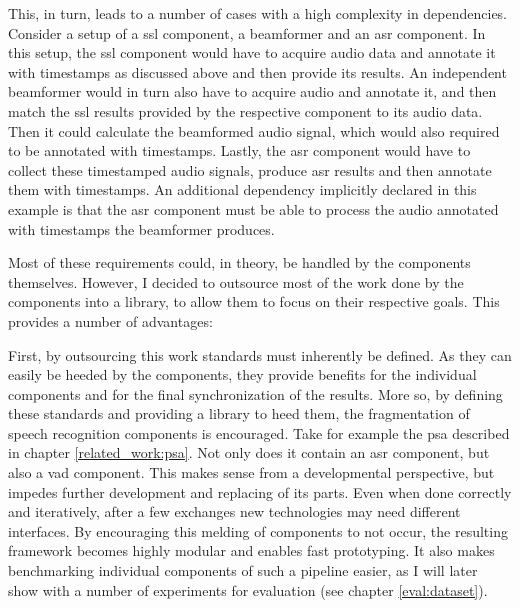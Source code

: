 This, in turn, leads to a number of cases with a high complexity in dependencies.
Consider a setup of a \gls{ssl} component, a beamformer and an \gls{asr} component.
In this setup, the \gls{ssl} component would have to acquire audio data and annotate it with timestamps as discussed above and then provide its results.
An independent beamformer would in turn also have to acquire audio and annotate it, and then match the \gls{ssl} results provided by the respective component to its audio data.
Then it could calculate the beamformed audio signal, which would also required to be annotated with timestamps.
Lastly, the \gls{asr} component would have to collect these timestamped audio signals, produce \gls{asr} results and then annotate them with timestamps.
An additional dependency implicitly declared in this example is that the \gls{asr} component must be able to process the audio annotated with timestamps the beamformer produces.

Most of these requirements could, in theory, be handled by the components themselves.
However, I decided to outsource most of the work done by the components into a library, to allow them to focus on their respective goals.
This provides a number of advantages:

First, by outsourcing this work standards must inherently be defined.
As they can easily be heeded by the components, they provide benefits for the individual components and for the final synchronization of the results.
More so, by defining these standards and providing a library to heed them, the fragmentation of speech recognition components is encouraged. 
Take for example the \gls{psa} described in chapter \ref{related_work:psa}.
Not only does it contain an \gls{asr} component, but also a \gls{vad} component.
This makes sense from a developmental perspective, but impedes further development and replacing of its parts.
Even when done correctly and iteratively, after a few exchanges new technologies may need different interfaces.
By encouraging this melding of components to not occur, the resulting framework becomes highly modular and enables fast prototyping.
It also makes benchmarking individual components of such a pipeline easier, as I will later show with a number of experiments for evaluation (see chapter \ref{eval:dataset}).

